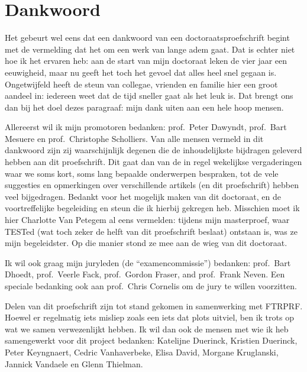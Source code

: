 \documentclass[main]{subfiles}
\begin{document}

\chapter{Dankwoord}\label{ch:dankwoord}

Het gebeurt wel eens dat een dankwoord van een doctoraatsproefschrift begint met de vermelding dat het om een werk van lange adem gaat.
Dat is echter niet hoe ik het ervaren heb: aan de start van mijn doctoraat leken de vier jaar een eeuwigheid, maar nu geeft het toch het gevoel dat alles heel snel gegaan is.
Ongetwijfeld heeft de steun van collegae, vrienden en familie hier een groot aandeel in: iedereen weet dat de tijd sneller gaat als het leuk is.
Dat brengt ons dan bij het doel dezes paragraaf: mijn dank uiten aan een hele hoop mensen.

Allereerst wil ik mijn promotoren bedanken: prof.\ Peter Dawyndt, prof.\ Bart Mesuere en prof.\ Christophe Scholliers.
Van alle mensen vermeld in dit dankwoord zijn zij waarschijnlijk degenen die de inhoudelijkste bijdragen geleverd hebben aan dit proefschrift.
Dit gaat dan van de in regel wekelijkse vergaderingen waar we soms kort, soms lang bepaalde onderwerpen bespraken, tot de vele suggesties en opmerkingen over verschillende artikels (en dit proefschrift) hebben veel bijgedragen.
Bedankt voor het mogelijk maken van dit doctoraat, en de voortreffelijke begeleiding en steun die ik hierbij gekregen heb.
Misschien moet ik hier Charlotte Van Petegem al eens vermelden: tijdens mijn masterproef, waar TESTed (wat toch zeker de helft van dit proefschrift beslaat) ontstaan is, was ze mijn begeleidster.
Op die manier stond ze mee aan de wieg van dit doctoraat.

Ik wil ook graag mijn juryleden (de ``examencommissie'') bedanken: prof.\ Bart Dhoedt, prof.\ Veerle Fack, prof.\ Gordon Fraser, and prof.\ Frank Neven.
Een speciale bedanking ook aan prof.\ Chris Cornelis om de jury te willen voorzitten.

Delen van dit proefschrift zijn tot stand gekomen in samenwerking met FTRPRF\@.
Hoewel er regelmatig iets misliep zoals een iets dat plots uitviel, ben ik trots op wat we samen verwezenlijkt hebben.
Ik wil dan ook de mensen met wie ik heb samengewerkt voor dit project bedanken: Katelijne Duerinck, Kristien Duerinck, Peter Keyngnaert, Cedric Vanhaverbeke, Elisa David, Morgane Kruglanski, Jannick Vandaele en Glenn Thielman.
\end{document}
